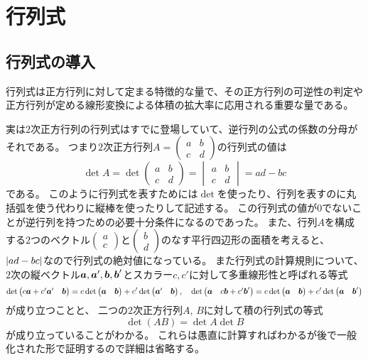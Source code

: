 
\chapter{行列式}

\section{行列式の導入}

行列式は正方行列に対して定まる特徴的な量で、その正方行列の可逆性の判定や正方行列が定める線形変換による体積の拡大率に応用される重要な量である。

実は$2$次正方行列の行列式はすでに登場していて、逆行列の公式の係数の分母がそれである。
つまり$2$次正方行列$A = \begin{pmatrix}a & b \\ c & d\end{pmatrix}$の行列式の値は
$$
\det A
= \det\begin{pmatrix}a & b \\ c & d\end{pmatrix}
= \begin{vmatrix}a & b \\ c & d\end{vmatrix}
= a d-b c
$$
である。
このように行列式を表すためには$\det$を使ったり、行列を表すのに丸括弧を使う代わりに縦棒を使ったりして記述する。
この行列式の値が$0$でないことが逆行列を持つための必要十分条件になるのであった。
また、行列$A$を構成する$2$つのベクトル$\begin{pmatrix}a \\ c\end{pmatrix}$と$\begin{pmatrix}b \\ d\end{pmatrix}$のなす平行四辺形の面積を考えると、$\abs{a d-b c}$なので行列式の絶対値になっている。
また行列式の計算規則について、
$2$次の縦ベクトル$\vb*{a}, \vb*{a}', \vb*{b}, \vb*{b}'$とスカラー$c, c'$に対して多重線形性と呼ばれる等式
$$
\det\begin{pmatrix}c\vb*{a}+c'\vb*{a}' & \vb*{b}\end{pmatrix}
= c\det\begin{pmatrix}\vb*{a} & \vb*{b}\end{pmatrix}+c'\det\begin{pmatrix}\vb*{a}' & \vb*{b}\end{pmatrix},
\quad \det\begin{pmatrix}\vb*{a} & c\vb*{b}+c'\vb*{b}'\end{pmatrix}
= c\det\begin{pmatrix}\vb*{a} & \vb*{b}\end{pmatrix}+c'\det\begin{pmatrix}\vb*{a} & \vb*{b}'\end{pmatrix}
$$
が成り立つことと、
二つの$2$次正方行列$A$, $B$に対して積の行列式の等式
$$
\det(A B) = \det A \det B
$$
が成り立っていることがわかる。
これらは愚直に計算すればわかるが後で一般化された形で証明するので詳細は省略する。

